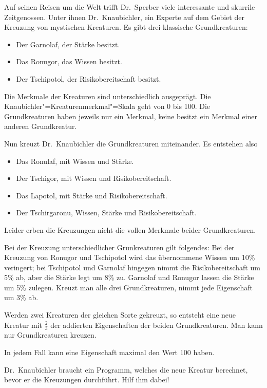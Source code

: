 \begin{aufgabe}
  \label{aufgabe:knaubichler}
  Auf seinen Reisen um die Welt trifft Dr.~Sperber
  viele interessante und skurrile Zeitgenossen. Unter ihnen
  Dr.~Knaubichler, ein Experte auf dem Gebiet der Kreuzung von
  mystischen Kreaturen.  Es gibt drei klassische Grundkreaturen:

  \begin{itemize}
  \item Der Garnolaf, der Stärke besitzt.
  \item Das Ronugor, das Wissen besitzt.
  \item Der Tschipotol, der Risikobereitschaft besitzt.
  \end{itemize}
  
  Die Merkmale der Kreaturen sind unterschiedlich ausgeprägt.  Die
  Knaubichler"=Kreaturenmerkmal"=Skala geht von 0 bis 100.  Die
  Grundkreaturen haben jeweils nur ein Merkmal, keine besitzt ein
  Merkmal einer anderen Grundkreatur.

  Nun kreuzt Dr.~Knaubichler die Grundkreaturen miteinander. Es
  entstehen also
  \begin{itemize}
  \item Das Ronulaf, mit Wissen und Stärke.
  \item Der Tschigor, mit Wissen und Risikobereitschaft.
  \item Das Lapotol, mit Stärke und Risikobereitschaft.
  \item Der Tschirgaronu, Wissen, Stärke und Risikobereitschaft.
  \end{itemize}
  
  Leider erben die Kreuzungen nicht die vollen Merkmale beider
  Grundkreaturen.

  Bei der Kreuzung unterschiedlicher Grunkreaturen gilt folgendes:
  Bei der Kreuzung von Ronugor und Tschipotol wird
  das übernommene Wissen um 10\% veringert; bei Tschipotol und
  Garnolaf hingegen nimmt die Risikobereitschaft um 5\% ab, aber die
  Stärke legt um 8\% zu. Garnolaf und Ronugor lassen die Stärke um 5\%
  zulegen. Kreuzt man alle drei Grundkreaturen, nimmt jede Eigenschaft
  um 3\% ab.
  
  Werden zwei Kreaturen der gleichen Sorte gekreuzt, so entsteht eine
  neue Kreatur mit $\frac{2}{3}$ der addierten Eigenschaften der
  beiden Grundkreaturen. Man kann nur Grundkreaturen kreuzen.

  In jedem Fall kann eine Eigenschaft maximal den Wert 100
  haben.
    
  Dr.~Knaubichler braucht ein Programm, welches die neue Kreatur
  berechnet, bevor er die Kreuzungen durchführt.  Hilf ihm
  dabei!
  

\end{aufgabe}
